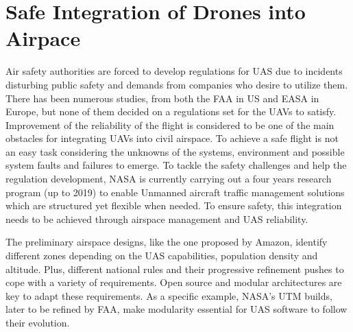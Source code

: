 
{}

\chapter{Safe Integration of Drones into Airpace}


Air safety authorities are forced to develop regulations for UAS due to incidents 
disturbing public safety and demands from companies who desire to utilize them. 
There has been numerous studies, from both the FAA in US and EASA in Europe, 
but none of them decided on a regulations set for the UAVs to satisfy. Improvement 
of the reliability of the flight is considered to be one of the main obstacles for 
integrating UAVs into civil airspace. To achieve a safe flight is not an easy task 
considering the unknowns of the systems, environment and possible system faults 
and failures to emerge. To tackle the safety challenges and help the regulation 
development, NASA is currently carrying out a four years research program (up to 2019) 
to enable Unmanned aircraft traffic management solutions which are structured yet 
flexible when needed. To ensure safety, this integration needs to be achieved through 
airspace management and UAS reliability.

The preliminary airspace designs, like the one proposed by Amazon, identify different 
zones depending on the UAS capabilities, population density and altitude. Plus, 
different national rules and their progressive refinement pushes to cope with a variety 
of requirements. Open source and modular architectures are key to adapt these 
requirements. As a specific example, NASA's UTM builds, later to be refined by FAA, 
make modularity essential for UAS software to follow their evolution. 

